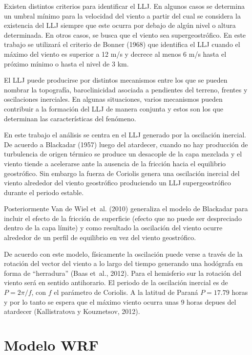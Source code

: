 \documentclass[12pt,spanish,oneside, a4paper]{book}
\begin{document}
Existen distintos criterios para identificar el LLJ. En algunos casos se
determina un umbral mínimo para la velocidad del viento a partir del
cual se considera la existencia del LLJ siempre que este ocurra por
debajo de algún nivel o altura determinada. En otros casos, se busca que
el viento sea supergeostrófico. En este trabajo se utilizará el criterio
de Bonner (1968) que identifica el LLJ cuando el máximo del viento es
superior a 12 m/s y decrece al menos 6 m/s hasta el próximo mínimo o
hasta el nivel de 3 km.

El LLJ puede producirse por distintos mecanismos entre los que se pueden
nombrar la topografía, baroclinicidad asociada a pendientes del terreno,
frentes y oscilaciones inerciales. En algunas situaciones, varios
mecanismos pueden contribuir a la formación del LLJ de manera conjunta y
estos son los que determinan las características del fenómeno.

En este trabajo el análisis se centra en el LLJ generado por la
oscilación inercial. De acuerdo a Blackadar (1957) luego del atardecer,
cuando no hay producción de turbulencia de origen térmico se produce un
desacople de la capa mezclada y el viento tiende a acelerarse ante la
ausencia de la fricción hacia el equilibrio geostrófico. Sin embargo la
fuerza de Coriolis genera una oscilación inercial del viento alrededor
del viento geostrófico produciendo un LLJ supergeostrófico durante el
periodo estable.

Posteriormente Van de Wiel et~al. (2010) generaliza el modelo de
Blackadar para incluir el efecto de la fricción de superficie (efecto
que no puede ser despreciado dentro de la capa límite) y como resultado
la oscilación del viento ocurre alrededor de un perfil de equilibrio en
vez del viento geostrófico.

De acuerdo con este modelo, físicamente la oscilación puede verse a
través de la rotación del vector del viento a lo largo del tiempo
generando una hodógrafa en forma de ``herradura'' (Baas et~al., 2012).
Para el hemisferio sur la rotación del viento será en sentido
antihorario. El periodo de la oscilación inercial es de \(P = 2\pi/f\),
con \(f\) el parámetro de Coriolis. A la latitud de Paraná \(P = 17.79\)
horas y por lo tanto se espera que el máximo viento ocurra unas 9 horas
depues del atardecer (Kallistratova y Kouznetsov, 2012).

\section{Modelo WRF}\label{modelo-wrf}
\end{document}
